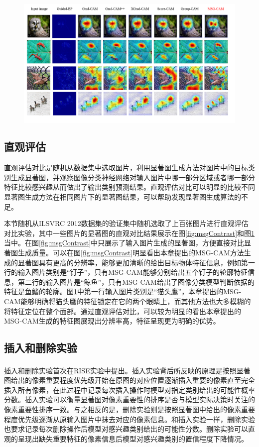 \begin{figure}[!ht]
	\centering 
	\includegraphics[width=15cm]{fig/ch3/msgContrast2.png}
	\label{fig:msgContrast2}
\end{figure}
\subsection{直观评估}
直观评估对比是随机从数据集中选取图片，利用显著图生成方法对图片中的目标类别生成显著图，并观察图像分类神经网络对输入图片中哪一部分区域或者哪一部分特征比较感兴趣从而做出了输出类别预测结果。直观评估对比可以明显的比较不同显著图生成方法在相同图片下的显著图结果，可以帮助发现显著图生成算法的不足。

本节随机从ILSVRC 2012数据集的验证集中随机选取了上百张图片进行直观评估对比实验，其中一些图片的显著图的直观对比结果展示在图\ref{fig:msgContrast}和图\ref{fig:msgContrast2}当中。在图\ref{fig:msgContrast}中只展示了输入图片生成的显著图，方便直接对比显著图生成质量。可以在图\ref{fig:msgContrast}明显看出本章提出的MSG-CAM方法生成的显著图具有更高的分辨率，能够更加清晰的给出目标物体特征信息，例如第一行的输入图片类别是“钉子”，只有MSG-CAM能够分别给出五个钉子的轮廓特征信息，第二行的输入图片是“鲸鱼”，只有MSG-CAM给出了图像分类模型判断依据的特征是鱼鳍的轮廓。图\ref{fig:msgContrast2}中第一行输入图片类别是“猫头鹰”，本章提出的MSG-CAM能够明确将猫头鹰的特征锁定在它的两个眼睛上，而其他方法也大多模糊的将特征定位在整个面部。通过直观评估对比，可以较为明显的看出本章提出的MSG-CAM生成的特征图展现出分辨率高，特征呈现更为明确的优势。



\subsection{插入和删除实验}
插入和删除实验首次在RISE\textsuperscript{\cite{petsiuk2018rise}}实验中提出。插入实验背后所反映的原理是按照显著图给出的像素重要程度优先级开始在原图的对应位置逐渐插入重要的像素直至完全插入所有像素，在此过程中记录每次插入操作时模型对指定类别给出的可能性概率分数。插入实验可以衡量显著图对像素重要性的排序是否与模型实际决策时关注的像素重要性排序一致。与之相反的是，删除实验则是按照显著图中给出的像素重要程度优先级逐渐从原输入图片中抹去对应的像素信息。和插入实验一样，删除实验也要求记录每次删除操作后模型对感兴趣类别给出的可能性分数。删除实验可以直观的呈现出缺失重要特征的像素信息后模型对感兴趣类别的置信程度下降情况。

